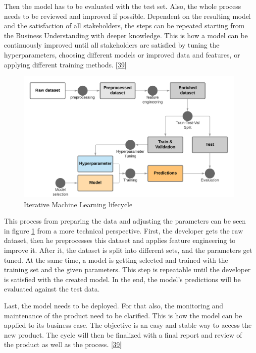\documentclass[12pt,english,a4paper,oneside,,tablecaptionabove]{scrbook}
\begin{document}
Then the model has to be evaluated with the test set. Also, the whole
process needs to be reviewed and improved if possible. Dependent on the
resulting model and the satisfaction of all stakeholders, the steps can
be repeated starting from the Business Understanding with deeper
knowledge. This is how a model can be continuously improved until all
stakeholders are satisfied by tuning the hyperparameters, choosing
different models or improved data and features, or applying different
training methods. {[}\protect\hyperlink{ref-Wirth2000}{39}{]}

\begin{figure}
\hypertarget{fig:ml_cycle}{%
\centering
\includegraphics[width=5.20833in,height=\textheight]{images/chapter2/training_cycle.png}
\caption{Iterative Machine Learning lifecycle}\label{fig:ml_cycle}
}
\end{figure}

This process from preparing the data and adjusting the parameters can be
seen in figure \ref{fig:ml_cycle} from a more technical perspective.
First, the developer gets the raw dataset, then he preprocesses this
dataset and applies feature engineering to improve it. After it, the
dataset is split into different sets, and the parameters get tuned. At
the same time, a model is getting selected and trained with the training
set and the given parameters. This step is repeatable until the
developer is satisfied with the created model. In the end, the model's
predictions will be evaluated against the test data.

Last, the model needs to be deployed. For that also, the monitoring and
maintenance of the product need to be clarified. This is how the model
can be applied to its business case. The objective is an easy and stable
way to access the new product. The cycle will then be finalized with a
final report and review of the product as well as the process.
{[}\protect\hyperlink{ref-Wirth2000}{39}{]}
\end{document}
